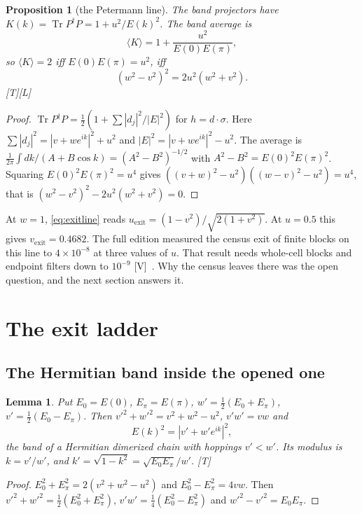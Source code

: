 \documentclass[11pt]{article}
\newtheorem{proposition}[theorem]{Proposition}
\newtheorem{lemma}[theorem]{Lemma}
\theoremstyle{definition}
\newcommand{\grade}[1]{\textsf{\small[#1]}}
\newcommand{\Tr}{\operatorname{Tr}}
\begin{document}
\begin{proposition}[the Petermann line]\label{prop:petermann}
The band projectors have $K(k)=\Tr P^\dagger P=1+u^2/E(k)^2$. The band average is
\[
\langle K\rangle=1+\frac{u^2}{E(0)E(\pi)},
\]
so $\langle K\rangle=2$ iff $E(0)E(\pi)=u^2$, iff
\begin{equation}\label{eq:exitline}
(w^2-v^2)^2=2u^2(w^2+v^2).
\end{equation}
\grade{T}\grade{L}
\end{proposition}
\begin{proof}
$\Tr P^\dagger P=\tfrac12(1+\sum|d_j|^2/|E|^2)$ for $h=d\cdot\sigma$. Here $\sum|d_j|^2=|v+we^{ik}|^2+u^2$ and $|E|^2=|v+we^{ik}|^2-u^2$. The average is $\frac1{2\pi}\int dk/(A+B\cos k)=(A^2-B^2)^{-1/2}$ with $A^2-B^2=E(0)^2E(\pi)^2$. Squaring $E(0)^2E(\pi)^2=u^4$ gives $((v+w)^2-u^2)((w-v)^2-u^2)=u^4$, that is $(w^2-v^2)^2-2u^2(w^2+v^2)=0$.
\end{proof}
At $w=1$, \eqref{eq:exitline} reads $u_{\mathrm{exit}}=(1-v^2)/\sqrt{2(1+v^2)}$. At $u=0.5$ this gives $v_{\mathrm{exit}}=0.4682$. The full edition measured the census exit of finite blocks on this line to $4\times10^{-8}$ at three values of $u$. That result needs whole-cell blocks and endpoint filters down to $10^{-9}$ \grade{V}~\cite{matter4}. Why the census leaves there was the open question, and the next section answers it.

\section{The exit ladder}\label{sec:ladder}
\subsection{The Hermitian band inside the opened one}
\begin{lemma}\label{lem:band}
Put $E_0=E(0)$, $E_\pi=E(\pi)$, $w'=\tfrac12(E_0+E_\pi)$, $v'=\tfrac12(E_0-E_\pi)$. Then $v'^2+w'^2=v^2+w^2-u^2$, $v'w'=vw$ and
\[
E(k)^2=|v'+w'e^{ik}|^2,
\]
the band of a Hermitian dimerized chain with hoppings $v'<w'$. Its modulus is $k=v'/w'$, and $k'=\sqrt{1-k^2}=\sqrt{E_0E_\pi}/w'$. \grade{T}
\end{lemma}
\begin{proof}
$E_0^2+E_\pi^2=2(v^2+w^2-u^2)$ and $E_0^2-E_\pi^2=4vw$. Then $v'^2+w'^2=\tfrac12(E_0^2+E_\pi^2)$, $v'w'=\tfrac14(E_0^2-E_\pi^2)$ and $w'^2-v'^2=E_0E_\pi$.
\end{proof}
\end{document}
